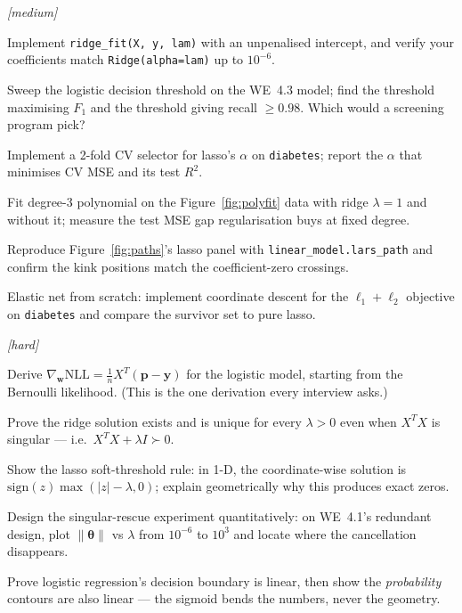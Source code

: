 \emph{[medium]}
\begin{exercise}
Implement \texttt{ridge\_fit(X, y, lam)} with an unpenalised intercept,
and verify your coefficients match \texttt{Ridge(alpha=lam)} up to
$10^{-6}$.
\end{exercise}
\begin{exercise}
Sweep the logistic decision threshold on the WE~4.3 model; find the
threshold maximising $F_1$ and the threshold giving recall $\ge 0.98$.
Which would a screening program pick?
\end{exercise}
\begin{exercise}
Implement a 2-fold CV selector for lasso's $\alpha$ on
\texttt{diabetes}; report the $\alpha$ that minimises CV MSE and its
test $R^2$.
\end{exercise}
\begin{exercise}
Fit degree-3 polynomial on the Figure~\ref{fig:polyfit} data with
ridge $\lambda=1$ and without it; measure the test MSE gap regularisation
buys at fixed degree.
\end{exercise}
\begin{exercise}
Reproduce Figure~\ref{fig:paths}'s lasso panel with
\texttt{linear\_model.lars\_path} and confirm the kink positions match
the coefficient-zero crossings.
\end{exercise}
\begin{exercise}
Elastic net from scratch: implement coordinate descent for the
$\ell_1{+}\ell_2$ objective on \texttt{diabetes} and compare the survivor
set to pure lasso.
\end{exercise}

\emph{[hard]}
\begin{exercise}
Derive $\nabla_{\mathbf w}\mathrm{NLL} = \frac{1}{n}X^T(\mathbf p -
\mathbf y)$ for the logistic model, starting from the Bernoulli
likelihood. (This is the one derivation every interview asks.)
\end{exercise}
\begin{exercise}
Prove the ridge solution exists and is unique for every $\lambda > 0$
even when $X^TX$ is singular --- i.e.\ $X^TX + \lambda I \succ 0$.
\end{exercise}
\begin{exercise}
Show the lasso soft-threshold rule: in 1-D, the coordinate-wise solution
is $\mathrm{sign}(z)\max(|z| - \lambda, 0)$; explain geometrically why
this produces exact zeros.
\end{exercise}
\begin{exercise}
Design the singular-rescue experiment quantitatively: on WE~4.1's
redundant design, plot $\|\boldsymbol\theta\|$ vs $\lambda$ from
$10^{-6}$ to $10^{3}$ and locate where the cancellation disappears.
\end{exercise}
\begin{exercise}
Prove logistic regression's decision boundary is linear, then show the
\emph{probability} contours are also linear --- the sigmoid bends the
numbers, never the geometry.
\end{exercise}

